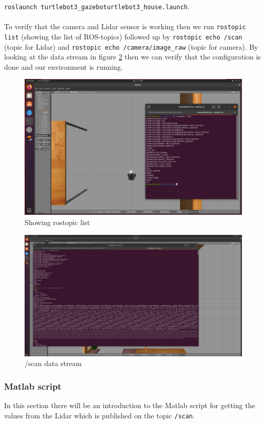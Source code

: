 \documentclass[12pt,a4paper]{article}
\begin{document}
	\noindent\texttt{roslaunch turtlebot3\_gazebo}\texttt{turtlebot3\_house.launch}.
	\\\\
	To verify that the camera and Lidar sensor is working then we run \texttt{rostopic list} (showing the list of ROS-topics) followed up by \texttt{rostopic echo /scan} (topic for Lidar) and \texttt{rostopic echo /camera/image\_raw} (topic for camera). By looking at the data stream in figure \ref{fig:fig5} then we can verify that the configuration is done and our environment is running.
	\begin{figure}[!h]
		\centering
		\includegraphics[width=\linewidth]{fig4.png}
		\caption{Showing rostopic list}
		\label{fig:fig4}
	\end{figure}
	\begin{figure}[!h]
		\centering
		\includegraphics[width=\linewidth]{fig5.png}
		\caption{/scan data stream}
		\label{fig:fig5}
	\end{figure}
	\subsubsection{Matlab script}
	In this section there will be an introduction to the Matlab script for getting the values from the Lidar which is published on the topic \texttt{/scan}.
	
\end{document}
